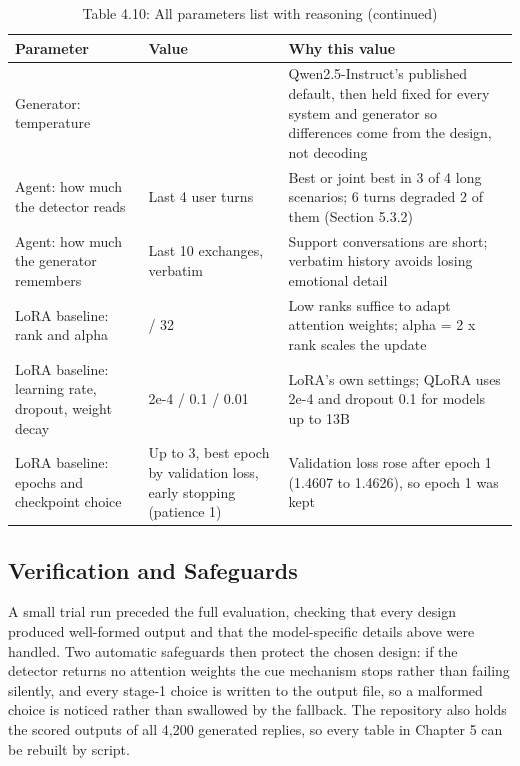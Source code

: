 \begin{table}[H]
\centering
\footnotesize
\renewcommand{\arraystretch}{1.1}
\begin{tabularx}{\textwidth}{@{}>{\raggedright\arraybackslash}p{}>{\raggedright\arraybackslash}p{}>{\raggedright\arraybackslash}X@{}}
\toprule
\textbf{Parameter} & \textbf{Value} & \textbf{Why this value} \\
\midrule
Generator: temperature & 0.7 & Qwen2.5-Instruct's published default, then held fixed for every system and generator so differences come from the design, not decoding \\
Agent: how much the detector reads & Last 4 user turns & Best or joint best in 3 of 4 long scenarios; 6 turns degraded 2 of them (Section 5.3.2) \\
Agent: how much the generator remembers & Last 10 exchanges, verbatim & Support conversations are short; verbatim history avoids losing emotional detail \\
LoRA baseline: rank and alpha & 16 / 32 & Low ranks suffice to adapt attention weights; alpha = 2 x rank scales the update \\
LoRA baseline: learning rate, dropout, weight decay & 2e-4 / 0.1 / 0.01 & LoRA's own settings; QLoRA uses 2e-4 and dropout 0.1 for models up to 13B \\
LoRA baseline: epochs and checkpoint choice & Up to 3, best epoch by validation loss, early stopping (patience 1) & Validation loss rose after epoch 1 (1.4607 to 1.4626), so epoch 1 was kept \\
\bottomrule
\end{tabularx}
\caption*{Table 4.10: All parameters list with reasoning (continued)}
\end{table}

\subsection{Verification and Safeguards}

A small trial run preceded the full evaluation, checking that every design produced well-formed output and that the model-specific details above were handled. Two automatic safeguards then protect the chosen design: if the detector returns no attention weights the cue mechanism stops rather than failing silently, and every stage-1 choice is written to the output file, so a malformed choice is noticed rather than swallowed by the fallback. The repository also holds the scored outputs of all 4,200 generated replies, so every table in Chapter 5 can be rebuilt by script.
